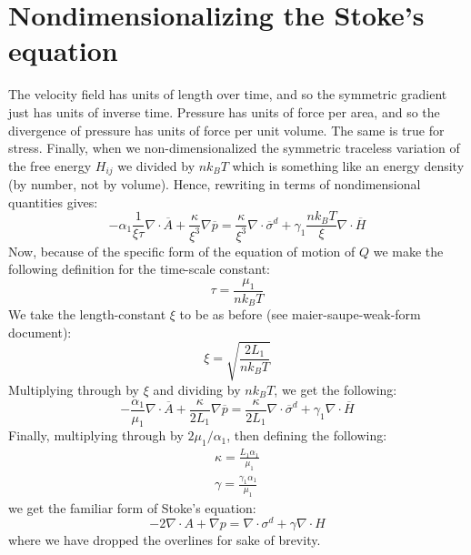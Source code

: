 \documentclass[reqno]{article}
\begin{document}
  \section{Nondimensionalizing the Stoke's equation}
  The velocity field has units of length over time, and so the symmetric
  gradient just has units of inverse time.
  Pressure has units of force per area, and so the divergence of pressure has
  units of force per unit volume.
  The same is true for stress.
  Finally, when we non-dimensionalized the symmetric traceless variation of the
  free energy $H_{ij}$ we divided by $n k_B T$ which is something like an energy
  density (by number, not by volume).
  Hence, rewriting in terms of nondimensional quantities gives:
  \begin{equation}
    -\alpha_1 \frac{1}{\xi \tau} \nabla \cdot \overline{A}
    + \frac{\kappa}{\xi^3} \nabla \overline{p}
    =
    \frac{\kappa}{\xi^3} \nabla \cdot \overline{\sigma}^d
    + \gamma_1 \frac{n k_B T}{\xi} \nabla \cdot \overline{H}
  \end{equation}
  Now, because of the specific form of the equation of motion of $Q$ we make the
  following definition for the time-scale constant:
  \begin{equation}
    \tau
    =
    \frac{\mu_1}{n k_B T}
  \end{equation}
  We take the length-constant $\xi$ to be as before (see maier-saupe-weak-form
  document):
  \begin{equation}
    \xi
    =
    \sqrt{\frac{2 L_1}{n k_B T}}
  \end{equation}
  Multiplying through by $\xi$ and dividing by $n k_B T$, we get the following:
  \begin{equation}
    - \frac{\alpha_1}{\mu_1} \nabla \cdot \overline{A}
    + \frac{\kappa}{2 L_1} \nabla \overline{p}
    =
    \frac{\kappa}{2 L_1} \nabla \cdot \overline{\sigma}^d
    + \gamma_1 \nabla \cdot \overline{H}
  \end{equation}
  Finally, multiplying through by $2 \mu_1 / \alpha_1$, then defining the
  following:
  \begin{equation}
    \begin{split}
      \kappa = \frac{L_1 \alpha_1}{\mu_1} \\
      \gamma = \frac{\gamma_1 \alpha_1}{\mu_1}
    \end{split}
  \end{equation}
  we get the familiar form of Stoke's equation:
  \begin{equation}
    - 2\nabla \cdot A
    + \nabla p
    =
    \nabla \cdot \sigma^d
    + \gamma \nabla \cdot H
  \end{equation}
  where we have dropped the overlines for sake of brevity.
\end{document}
